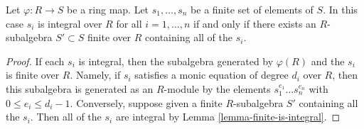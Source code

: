 \begin{lemma}
\label{lemma-characterize-integral}
Let $\varphi : R \to S$ be a ring map. Let $s_1, \ldots, s_n$
be a finite set of elements of $S$.
In this case $s_i$ is integral over $R$ for all $i = 1, \ldots, n$
if and only if
there exists an $R$-subalgebra $S' \subset S$ finite over $R$
containing all of the $s_i$.
\end{lemma}

\begin{proof}
If each $s_i$ is integral, then the subalgebra
generated by $\varphi(R)$ and the $s_i$ is finite
over $R$. Namely, if $s_i$ satisfies a monic equation
of degree $d_i$ over $R$, then this subalgebra is generated as an
$R$-module by the elements $s_1^{e_1} \ldots s_n^{e_n}$
with $0 \leq e_i \leq d_i - 1$.
Conversely, suppose given a finite $R$-subalgebra
$S'$ containing all the $s_i$. Then all of the
$s_i$ are integral by Lemma \ref{lemma-finite-is-integral}.
\end{proof}
